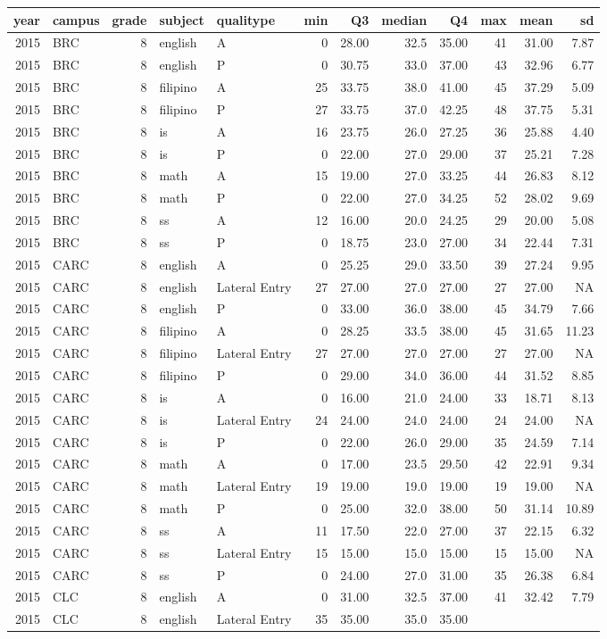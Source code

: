 \documentclass[]{article}
\begin{document}
\begin{longtable}[]{@{}rlrllrrrrrrr@{}}
\toprule
year & campus & grade & subject & qualitype & min & Q3 & median & Q4 &
max & mean & sd\tabularnewline
\midrule
\endhead
2015 & BRC & 8 & english & A & 0 & 28.00 & 32.5 & 35.00 & 41 & 31.00 &
7.87\tabularnewline
2015 & BRC & 8 & english & P & 0 & 30.75 & 33.0 & 37.00 & 43 & 32.96 &
6.77\tabularnewline
2015 & BRC & 8 & filipino & A & 25 & 33.75 & 38.0 & 41.00 & 45 & 37.29 &
5.09\tabularnewline
2015 & BRC & 8 & filipino & P & 27 & 33.75 & 37.0 & 42.25 & 48 & 37.75 &
5.31\tabularnewline
2015 & BRC & 8 & is & A & 16 & 23.75 & 26.0 & 27.25 & 36 & 25.88 &
4.40\tabularnewline
2015 & BRC & 8 & is & P & 0 & 22.00 & 27.0 & 29.00 & 37 & 25.21 &
7.28\tabularnewline
2015 & BRC & 8 & math & A & 15 & 19.00 & 27.0 & 33.25 & 44 & 26.83 &
8.12\tabularnewline
2015 & BRC & 8 & math & P & 0 & 22.00 & 27.0 & 34.25 & 52 & 28.02 &
9.69\tabularnewline
2015 & BRC & 8 & ss & A & 12 & 16.00 & 20.0 & 24.25 & 29 & 20.00 &
5.08\tabularnewline
2015 & BRC & 8 & ss & P & 0 & 18.75 & 23.0 & 27.00 & 34 & 22.44 &
7.31\tabularnewline
2015 & CARC & 8 & english & A & 0 & 25.25 & 29.0 & 33.50 & 39 & 27.24 &
9.95\tabularnewline
2015 & CARC & 8 & english & Lateral Entry & 27 & 27.00 & 27.0 & 27.00 &
27 & 27.00 & NA\tabularnewline
2015 & CARC & 8 & english & P & 0 & 33.00 & 36.0 & 38.00 & 45 & 34.79 &
7.66\tabularnewline
2015 & CARC & 8 & filipino & A & 0 & 28.25 & 33.5 & 38.00 & 45 & 31.65 &
11.23\tabularnewline
2015 & CARC & 8 & filipino & Lateral Entry & 27 & 27.00 & 27.0 & 27.00 &
27 & 27.00 & NA\tabularnewline
2015 & CARC & 8 & filipino & P & 0 & 29.00 & 34.0 & 36.00 & 44 & 31.52 &
8.85\tabularnewline
2015 & CARC & 8 & is & A & 0 & 16.00 & 21.0 & 24.00 & 33 & 18.71 &
8.13\tabularnewline
2015 & CARC & 8 & is & Lateral Entry & 24 & 24.00 & 24.0 & 24.00 & 24 &
24.00 & NA\tabularnewline
2015 & CARC & 8 & is & P & 0 & 22.00 & 26.0 & 29.00 & 35 & 24.59 &
7.14\tabularnewline
2015 & CARC & 8 & math & A & 0 & 17.00 & 23.5 & 29.50 & 42 & 22.91 &
9.34\tabularnewline
2015 & CARC & 8 & math & Lateral Entry & 19 & 19.00 & 19.0 & 19.00 & 19
& 19.00 & NA\tabularnewline
2015 & CARC & 8 & math & P & 0 & 25.00 & 32.0 & 38.00 & 50 & 31.14 &
10.89\tabularnewline
2015 & CARC & 8 & ss & A & 11 & 17.50 & 22.0 & 27.00 & 37 & 22.15 &
6.32\tabularnewline
2015 & CARC & 8 & ss & Lateral Entry & 15 & 15.00 & 15.0 & 15.00 & 15 &
15.00 & NA\tabularnewline
2015 & CARC & 8 & ss & P & 0 & 24.00 & 27.0 & 31.00 & 35 & 26.38 &
6.84\tabularnewline
2015 & CLC & 8 & english & A & 0 & 31.00 & 32.5 & 37.00 & 41 & 32.42 &
7.79\tabularnewline
2015 & CLC & 8 & english & Lateral Entry & 35 & 35.00 & 35.0 & 35.00 &

\end{longtable}
\end{document}
